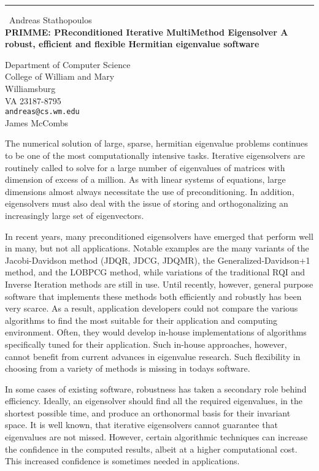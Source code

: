 \documentclass{report}
\begin{document}
\begin{center}
\rule{6in}{1pt} \
{\large Andreas Stathopoulos \\
{\bf PRIMME: PReconditioned Iterative MultiMethod Eigensolver A robust, efficient and flexible Hermitian eigenvalue software}}

Department of Computer Science \\ College of William and Mary \\ Williamsburg \\ VA 23187-8795
\\
{\tt andreas@cs.wm.edu}\\
James McCombs\end{center}

\small
The numerical solution of large, sparse, hermitian eigenvalue problems
continues to be one of the most computationally intensive tasks.
Iterative eigensolvers are routinely called to solve for a large number
of eigenvalues of matrices with dimension of excess of a million.
As with linear systems of equations, large dimensions almost always
necessitate the use of preconditioning. In addition, eigensolvers must
also deal with the issue of storing and orthogonalizing an increasingly
large set of eigenvectors.

In recent years, many preconditioned eigensolvers have emerged that
perform well in many, but not all applications. Notable examples are the
many variants of the Jacobi-Davidson method (JDQR, JDCG, JDQMR), the
Generalized-Davidson+1 method, and the LOBPCG method, while variations
of the traditional RQI and Inverse Iteration methods are still in use.
Until recently, however, general purpose software that implements these
methods both efficiently and robustly has been very scarce.
As a result, application developers
could not compare the various algorithms to find the most suitable for
their application and computing environment. Often, they would develop
in-house implementations of algorithms specifically tuned for their
application. Such in-house approaches, however, cannot benefit from
current advances in eigenvalue research. Such flexibility in choosing
from a variety of methods is missing in todays software.

In some cases of existing software, robustness has taken a secondary
role behind efficiency. Ideally, an eigensolver should find all the
required eigenvalues, in the shortest possible time, and produce an
orthonormal basis for their invariant space. It is well known, that
iterative eigensolvers cannot guarantee that eigenvalues are not missed.
However, certain algorithmic techniques can increase the confidence in
the computed results, albeit at a higher computational cost. This
increased confidence is sometimes needed in applications.
\end{document}
